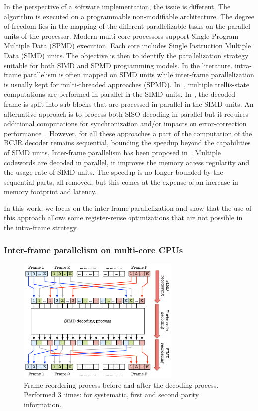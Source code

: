 In the perspective of a software implementation, the issue is different. The
algorithm is executed on a programmable non-modifiable architecture. The degree
of freedom lies in the mapping of the different parallelizable tasks on the
parallel units of the processor. Modern multi-core processors support Single
Program Multiple Data (SPMD) execution. Each core includes Single Instruction
Multiple Data (SIMD) units. The objective is then to identify the
parallelization strategy suitable for both SIMD and SPMD programming models.
In the literature, intra-frame parallelism is often mapped on SIMD units while
inter-frame parallelization is usually kept for multi-threaded approaches
(SPMD). In~\cite{Zhang2012,Wu2013}, multiple trellis-state computations are
performed in parallel in the SIMD units. In~\cite{Wu2010,Wu2011,Chinnici2012,
Yoge2012,Zhang2012,Liu2013,Chen2013,Xianjun2013,Wu2013,Zhang2014,Li2014}, the
decoded frame is split into sub-blocks that are processed in parallel in the
SIMD units. An alternative approach is to process both SISO decoding in parallel
but it requires additional computations for synchronization and/or impacts on
error-correction performance~\cite{Muller2009}. However, for all these
approaches a part of the computation of the BCJR decoder remains sequential,
bounding the speedup beyond the capabilities of SIMD units. Inter-frame
parallelism has been proposed in~\cite{Wu2010,Wu2011,Zhang2012,Wu2013}. Multiple
codewords are decoded in parallel, it improves the memory access regularity and
the usage rate of SIMD units. The speedup is no longer bounded by the sequential
parts, all removed, but this comes at the expense of an increase in memory
footprint and latency.

In this work, we focus on the inter-frame parallelization and show that the use
of this approach allows some register-reuse optimizations that are not possible
in the intra-frame strategy.

\subsubsection{Inter-frame parallelism on multi-core CPUs}

\begin{figure}
  \centering
  \includegraphics[width=0.70\textwidth]{turbo/reordering_process_inter_simd}
  \caption{Frame reordering process before and after the decoding process.
    Performed 3 times: for systematic, first and second parity information.}
  \label{fig:turbo_reordering_process_inter_simd}
\end{figure}

